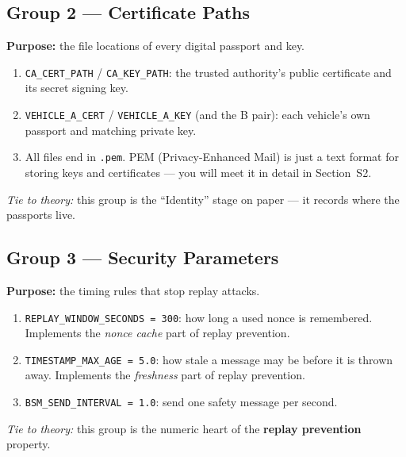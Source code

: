 \documentclass[11pt,a4paper]{article}
\begin{document}
\subsection{Group 2 --- Certificate Paths}
\textbf{Purpose:} the file locations of every digital passport and key.
\begin{enumerate}
  \item \texttt{CA\_CERT\_PATH} / \texttt{CA\_KEY\_PATH}: the trusted authority's
        public certificate and its secret signing key.
  \item \texttt{VEHICLE\_A\_CERT} / \texttt{VEHICLE\_A\_KEY} (and the B pair):
        each vehicle's own passport and matching private key.
  \item All files end in \texttt{.pem}. PEM (Privacy-Enhanced Mail) is just a
        text format for storing keys and certificates --- you will meet it in
        detail in Section~S2.
\end{enumerate}
\emph{Tie to theory:} this group is the ``Identity'' stage on paper --- it
records where the passports live.

\subsection{Group 3 --- Security Parameters}
\textbf{Purpose:} the timing rules that stop replay attacks.
\begin{enumerate}
  \item \texttt{REPLAY\_WINDOW\_SECONDS = 300}: how long a used nonce is
        remembered. Implements the \emph{nonce cache} part of replay prevention.
  \item \texttt{TIMESTAMP\_MAX\_AGE = 5.0}: how stale a message may be before it
        is thrown away. Implements the \emph{freshness} part of replay
        prevention.
  \item \texttt{BSM\_SEND\_INTERVAL = 1.0}: send one safety message per second.
\end{enumerate}
\emph{Tie to theory:} this group is the numeric heart of the
\textbf{replay prevention} property.
\end{document}
